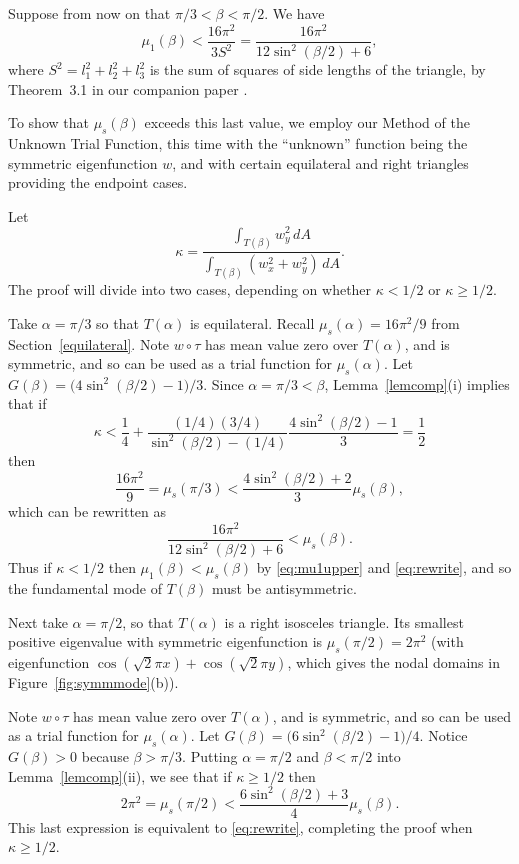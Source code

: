 \documentclass[11pt,reqno]{amsart}
\numberwithin{equation}{section}
\begin{document}
Suppose from now on that $\pi/3 < \beta < \pi/2$. We have
\begin{equation} \label{eq:mu1upper}
  \mu_1(\beta) <
  \frac{16\pi^2}{3S^2}=\frac{16\pi^2}{12\sin^2(\beta/2)+6},
\end{equation}
where $S^2=l_1^2+l_2^2+l_3^2$ is the sum of squares of side lengths of the triangle,
by Theorem~3.1 in our companion paper \cite{LS09a}. 

To show that $\mu_s(\beta)$ exceeds this last value, we employ our
Method of the Unknown Trial Function, this time with the
``unknown'' function being the symmetric eigenfunction $w$, and
with certain equilateral and right triangles providing the
endpoint cases.

Let
\[
\kappa = \frac{\int_{T(\beta)} w_y^2 \, dA}{\int_{T(\beta)} (w_x^2+w_y^2) \, dA} .
\]
The proof will divide into two cases, depending on whether $\kappa < 1/2$ or $\kappa \geq 1/2$.

Take $\alpha=\pi/3$ so that $T(\alpha)$ is equilateral. Recall $\mu_s(\alpha)=16\pi^2/9$ from Section~\ref{equilateral}. Note $w \circ \tau$ has mean value zero over $T(\alpha)$, and is symmetric, and so can be used as a trial function for $\mu_s(\alpha)$. Let $G(\beta)= \big( 4\sin^2(\beta/2) -1 \big)/3$. Since $\alpha=\pi/3 < \beta$, Lemma~\ref{lemcomp}(i) implies that if
\[
\kappa < \frac{1}{4} + \frac{(1/4)(3/4)}{\sin^2(\beta/2)-(1/4)} \frac{4\sin^2(\beta/2) - 1}{3} = \frac{1}{2}
\]
then
\[
\frac{16\pi^2}{9} = \mu_s(\pi/3) < \frac{4\sin^2(\beta/2) + 2}{3} \mu_s(\beta) ,
\]
which can be rewritten as
\begin{equation} \label{eq:rewrite}
\frac{16\pi^2}{12\sin^2(\beta/2)+6} < \mu_s(\beta) .
\end{equation}
Thus if $\kappa < 1/2$ then $\mu_1(\beta)<\mu_s(\beta)$ by \eqref{eq:mu1upper} and \eqref{eq:rewrite}, and so the fundamental mode of $T(\beta)$ must be antisymmetric.

Next take $\alpha=\pi/2$, so that $T(\alpha)$ is a right isosceles
triangle. Its smallest positive eigenvalue with symmetric
eigenfunction is $\mu_s(\pi/2)=2\pi^2$ (with eigenfunction
$\cos(\sqrt{2}\pi x)+\cos(\sqrt{2}\pi y)$, which gives the nodal domains in Figure~\ref{fig:symmmode}(b)). 

Note $w \circ \tau$ has mean value zero over
$T(\alpha)$, and is symmetric, and so can be used as a trial
function for $\mu_s(\alpha)$. Let $G(\beta)= \big(
6\sin^2(\beta/2) -1 \big)/4$. Notice $G(\beta)>0$ because
$\beta>\pi/3$. Putting $\alpha=\pi/2$ and $\beta<\pi/2$ into
Lemma~\ref{lemcomp}(ii), we see that if $\kappa \geq 1/2$ then
\[
2\pi^2 = \mu_s(\pi/2) < \frac{6\sin^2(\beta/2) + 3}{4} \mu_s(\beta) .
\]
This last expression is equivalent to \eqref{eq:rewrite}, completing the proof when $\kappa \geq 1/2$.
\end{document}
